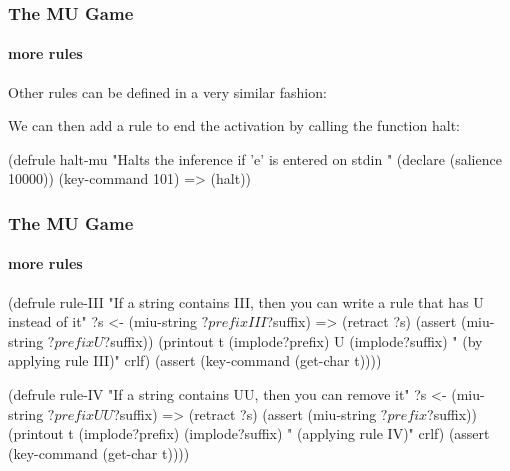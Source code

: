 \documentclass[xcolor={usenames,dvipsnames,svgnames}, compress]{beamer}
\begin{document}
\begin{frame}[fragile]
  \frametitle{The MU Game}
  \framesubtitle{more rules}
  Other rules can be defined in a very similar fashion:

  We can then add a rule to end the activation by calling the function
  \textsf{halt}:
  \begin{clips-code}[numbers=none]
    (defrule halt-mu
        "Halts the inference if 'e' is entered on stdin "
        (declare (salience 10000))
        (key-command 101)
        =>
        (halt))
  \end{clips-code}
      
\end{frame}

\begin{frame}[fragile]
  \frametitle{The MU Game}
  \framesubtitle{more rules}

  \begin{clips-code}[numbers=none]
    (defrule rule-III
        "If a string contains III, 
            then you can write a rule that has U instead of it"
        ?s <- (miu-string $?prefix I I I $?suffix)
        =>
        (retract ?s)
        (assert (miu-string $?prefix U $?suffix))
        (printout t (implode$ $?prefix) U (implode$ $?suffix)
            " (by applying rule III)" crlf)
        (assert (key-command (get-char t))))
  \end{clips-code} 
  \begin{clips-code}[numbers=none]
    (defrule rule-IV
        "If a string contains UU, then you can remove it"
        ?s <- (miu-string $?prefix U U $?suffix)
        =>
        (retract ?s)
        (assert (miu-string $?prefix $?suffix))
        (printout t (implode$ $?prefix) (implode$ $?suffix)
            " (applying rule IV)" crlf)
        (assert (key-command (get-char t))))  \end{clips-code}
\end{frame}
\end{document}
